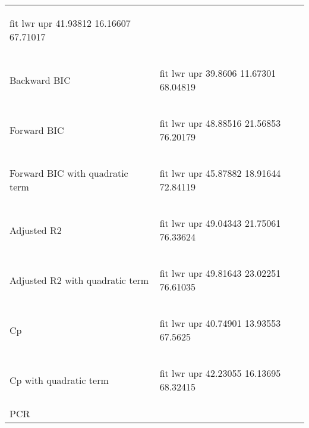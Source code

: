 \documentclass[a4paper]{article}
\begin{document}
\begin{longtable}{ l | p{10cm} }
\begin{Schunk}
\begin{Soutput}
      fit      lwr      upr
 41.93812 16.16607 67.71017
\end{Soutput}
\end{Schunk}
\\
Backward BIC &
\begin{Schunk}
\begin{Soutput}
     fit      lwr      upr
 39.8606 11.67301 68.04819
\end{Soutput}
\end{Schunk}
\\
Forward BIC &
\begin{Schunk}
\begin{Soutput}
      fit      lwr      upr
 48.88516 21.56853 76.20179
\end{Soutput}
\end{Schunk}
\\
Forward BIC with quadratic term&
\begin{Schunk}
\begin{Soutput}
      fit      lwr      upr
 45.87882 18.91644 72.84119
\end{Soutput}
\end{Schunk}
\\
Adjusted R2&
\begin{Schunk}
\begin{Soutput}
      fit      lwr      upr
 49.04343 21.75061 76.33624
\end{Soutput}
\end{Schunk}
\\
Adjusted R2 with quadratic term&
\begin{Schunk}
\begin{Soutput}
      fit      lwr      upr
 49.81643 23.02251 76.61035
\end{Soutput}
\end{Schunk}
\\
Cp&
\begin{Schunk}
\begin{Soutput}
      fit      lwr     upr
 40.74901 13.93553 67.5625
\end{Soutput}
\end{Schunk}
\\
Cp with quadratic term&
\begin{Schunk}
\begin{Soutput}
      fit      lwr      upr
 42.23055 16.13695 68.32415
\end{Soutput}
\end{Schunk}
\\
PCR&
\begin{Schunk}

\end{Schunk}
\end{longtable}
\end{document}
